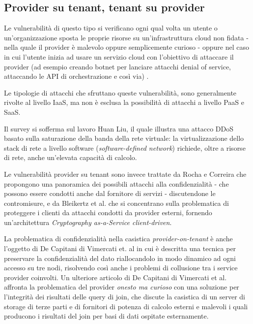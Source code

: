 \documentclass[../main.tex]{subfiles}
\begin{document}
\subsection{Provider su tenant, tenant su provider}
Le vulnerabilità di questo tipo si verificano ogni qual volta un utente o un'organizzazione sposta le proprie risorse su un'infrastruttura cloud non fidata - nella quale il provider è malevolo oppure semplicemente curioso - oppure nel caso in cui l'utente inizia ad usare un servizio cloud con l'obiettivo di attaccare il provider (ad esempio creando botnet per lanciare attacchi denial of service, attaccando le API di orchestrazione e così via) \cite{Ardagna:2015:SAC:2808687.2767005}.


Le tipologie di attacchi che sfruttano queste vulnerabilità, sono generalmente rivolte al livello IaaS\cite{Ardagna:2015:SAC:2808687.2767005}, ma non è esclusa la possibilità di attacchi a livello PaaS e SaaS.

Il survey si sofferma sul lavoro Huan Liu\cite{Liu:2010:NFD:1866835.1866849}, il quale illustra una attacco DDoS basato sulla saturazione della banda della rete virtuale: la virtualizzazione dello stack di rete a livello software (\textit{software-defined network}) richiede, oltre a risorse di rete, anche un'elevata capacità di calcolo.


Le vulnerabilità provider su tenant sono invece trattate da Rocha e Correira\cite{Ieee5958798} che propongono una panoramica dei possibili attacchi alla confidenzialità - che possono essere condotti anche dal fornitore di servizi - discutendone le contromisure, e da Bleikertz et al. \cite{Bleikertz:2013:CCC:2524523.2524526} che si concentrano sulla problematica di proteggere i clienti da attacchi condotti da provider esterni, fornendo un'architettura \textit{Cryptography as-a-Service client-driven}.


La problematica di confidenzialità nella casistica \textit{provider-on-tenant} è anche l'oggetto di De Capitani di Vimercati et. al\cite{Ieee7134727} in cui è descritta una tecnica per preservare la confidenzialità del dato riallocandolo in modo dinamico ad ogni accesso su tre nodi, risolvendo così anche i problemi di collusione tra i service provider coinvolti.
Un ulteriore articolo di De Capitani di Vimercati et al\cite{Ieee6681865}. affronta la problematica del provider \textit{onesto ma curioso} con una soluzione per l'integrità dei risultati delle query di join, che discute la casistica di un server di storage di terze parti e di fornitori di potenza di calcolo esterni e malevoli i quali producono i risultati del join per basi di dati ospitate esternamente.
\end{document}
